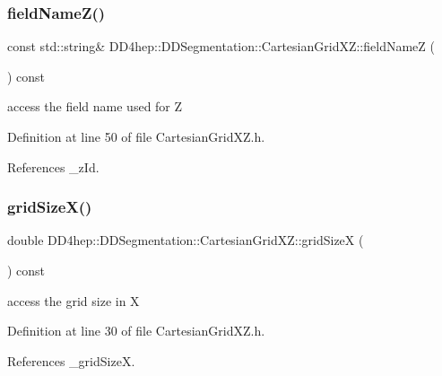 \subsubsection{\texorpdfstring{field\+Name\+Z()}{fieldNameZ()}}
{\footnotesize\ttfamily const std\+::string\& D\+D4hep\+::\+D\+D\+Segmentation\+::\+Cartesian\+Grid\+X\+Z\+::field\+NameZ (\begin{DoxyParamCaption}{ }\end{DoxyParamCaption}) const\hspace{0.3cm}{\ttfamily [inline]}}



access the field name used for Z 



Definition at line 50 of file Cartesian\+Grid\+X\+Z.\+h.



References \+\_\+z\+Id.

\hypertarget{class_d_d4hep_1_1_d_d_segmentation_1_1_cartesian_grid_x_z_afa2865ae620a199a6dc63a594fa03266}{}\label{class_d_d4hep_1_1_d_d_segmentation_1_1_cartesian_grid_x_z_afa2865ae620a199a6dc63a594fa03266} 
\subsubsection{\texorpdfstring{grid\+Size\+X()}{gridSizeX()}}
{\footnotesize\ttfamily double D\+D4hep\+::\+D\+D\+Segmentation\+::\+Cartesian\+Grid\+X\+Z\+::grid\+SizeX (\begin{DoxyParamCaption}{ }\end{DoxyParamCaption}) const\hspace{0.3cm}{\ttfamily [inline]}}



access the grid size in X 



Definition at line 30 of file Cartesian\+Grid\+X\+Z.\+h.



References \+\_\+grid\+SizeX.

\hypertarget{class_d_d4hep_1_1_d_d_segmentation_1_1_cartesian_grid_x_z_a56d325349bfa6aedd3e9d17e29d415ee}{}\label{class_d_d4hep_1_1_d_d_segmentation_1_1_cartesian_grid_x_z_a56d325349bfa6aedd3e9d17e29d415ee} 
